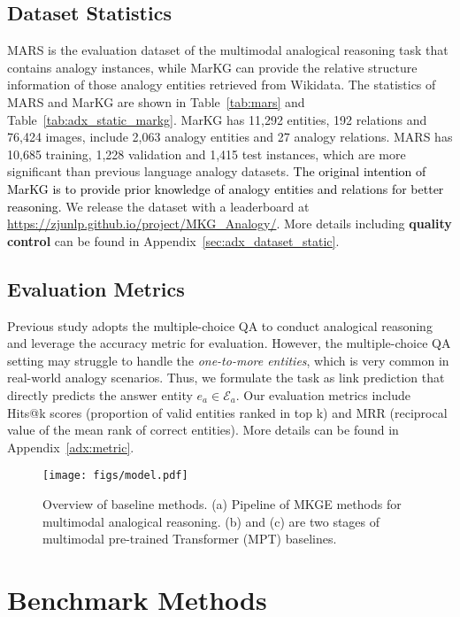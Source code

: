 \documentclass{article} \usepackage{iclr2023_conference,times}
\newcommand{\data}{MARS}
\newcommand{\kg}{MarKG}
\begin{document}
\subsection{Dataset Statistics}
{\data} is the evaluation dataset of the multimodal analogical reasoning task that contains analogy instances, while {\kg} can provide the relative structure information of those analogy entities retrieved from Wikidata.
The statistics of {\data} and  {\kg}  are shown in Table~\ref{tab:mars}
and Table~\ref{tab:adx_static_markg}. 
{\kg} has 11,292 entities, 192 relations and 76,424 images,  include 2,063 analogy entities and 27 analogy relations. 
{\data} has 10,685 training, 1,228 validation and 1,415 test instances, which are more significant than previous language analogy datasets. \textcolor{black}{The original intention of MarKG is to provide prior knowledge of analogy entities and relations for better reasoning.}
We release the dataset with a leaderboard at \url{https://zjunlp.github.io/project/MKG_Analogy/}.
More details including \textbf{quality control} can be found in Appendix~\ref{sec:adx_dataset_static}.


\subsection{Evaluation Metrics}
Previous study \citep{E-KAR} adopts the multiple-choice QA to conduct analogical reasoning and leverage the accuracy metric for evaluation. 
However, the multiple-choice QA setting may struggle to handle the \emph{one-to-more entities},
which is very common in real-world analogy scenarios.
Thus, we formulate the task as link prediction that directly predicts the answer entity $e_a \in \mathcal{E}_a$.
Our evaluation metrics include Hits@k scores (proportion of valid entities ranked in top k) and MRR (reciprocal value of the mean rank of correct entities). 
More details  can be found in Appendix~\ref{adx:metric}.

\begin{figure}[!t]
\centering
\texttt{[image: figs/model.pdf]}
\caption{
Overview of baseline methods. 
(a) Pipeline of MKGE methods for multimodal analogical reasoning. 
(b) and (c) are two stages of multimodal pre-trained Transformer (MPT) baselines.}
\label{fig:model}
\end{figure}


\section{Benchmark Methods}
\end{document}
